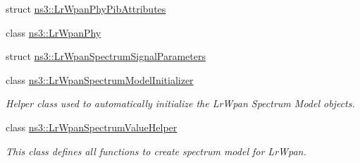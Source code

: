 \begin{DoxyCompactItemize}
\item 
struct \hyperlink{structns3_1_1LrWpanPhyPibAttributes}{ns3\+::\+Lr\+Wpan\+Phy\+Pib\+Attributes}
\item 
class \hyperlink{classns3_1_1LrWpanPhy}{ns3\+::\+Lr\+Wpan\+Phy}
\item 
struct \hyperlink{structns3_1_1LrWpanSpectrumSignalParameters}{ns3\+::\+Lr\+Wpan\+Spectrum\+Signal\+Parameters}
\item 
class \hyperlink{classns3_1_1LrWpanSpectrumModelInitializer}{ns3\+::\+Lr\+Wpan\+Spectrum\+Model\+Initializer}
\begin{DoxyCompactList}\small\item\em Helper class used to automatically initialize the Lr\+Wpan Spectrum Model objects. \end{DoxyCompactList}\item 
class \hyperlink{classns3_1_1LrWpanSpectrumValueHelper}{ns3\+::\+Lr\+Wpan\+Spectrum\+Value\+Helper}
\begin{DoxyCompactList}\small\item\em This class defines all functions to create spectrum model for Lr\+Wpan. \end{DoxyCompactList}\end{DoxyCompactItemize}
